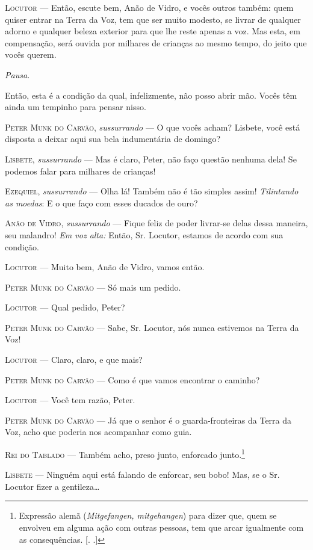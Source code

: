 \begin{myparindent}{0pt}
\begin{Parskip}
\textsc{Locutor} --- Então, escute bem, Anão de Vidro, e vocês outros também: quem
quiser entrar na Terra da Voz, tem que ser muito modesto, se livrar de
qualquer adorno e qualquer beleza exterior para que lhe reste apenas a
voz. Mas esta, em compensação, será ouvida por milhares de crianças ao
mesmo tempo, do jeito que vocês querem.

\emph{Pausa.}

Então, esta é a condição da qual, infelizmente, não posso abrir mão.
Vocês têm ainda um tempinho para pensar nisso.

\textsc{Peter Munk do Carvão}, \emph{sussurrando} --- O que vocês acham? Lisbete,
você está disposta a deixar aqui sua bela indumentária de domingo?

\textsc{Lisbete}, \emph{sussurrando} --- Mas é claro, Peter, não faço questão
nenhuma dela! Se podemos falar para milhares de crianças!

\textsc{Ezequiel}, \emph{sussurrando} --- Olha lá! Também não é tão simples assim!
\emph{Tilintando as moedas}: E o que faço com esses ducados de ouro?

\textsc{Anão de Vidro}, \emph{sussurrando} --- Fique feliz de poder livrar-se
delas dessa maneira, seu malandro! \emph{Em voz alta:} Então, Sr.
Locutor, estamos de acordo com sua condição.

\textsc{Locutor} --- Muito bem, Anão de Vidro, vamos então.

\textsc{Peter Munk do Carvão} --- Só mais um pedido.

\textsc{Locutor} --- Qual pedido, Peter?

\textsc{Peter Munk do Carvão} --- Sabe, Sr. Locutor, nós nunca estivemos na Terra
da Voz!

\textsc{Locutor} --- Claro, claro, e que mais?

\textsc{Peter Munk do Carvão} --- Como é que vamos encontrar o caminho?

\textsc{Locutor} --- Você tem razão, Peter.

\textsc{Peter Munk do Carvão} --- Já que o senhor é o guarda-fronteiras da Terra
da Voz, acho que poderia nos acompanhar como guia.

\textsc{Rei do Tablado} --- Também acho, preso junto, enforcado junto.\footnote{Expressão
  alemã (\emph{Mitgefangen, mitgehangen}) para dizer que, quem se
  envolveu em alguma ação com outras pessoas, tem que arcar igualmente
  com as consequências. [. .]}

\textsc{Lisbete} --- Ninguém aqui está falando de enforcar, seu bobo! Mas, se o
Sr. Locutor fizer a gentileza\ldots{}


\end{Parskip}
\end{myparindent}
